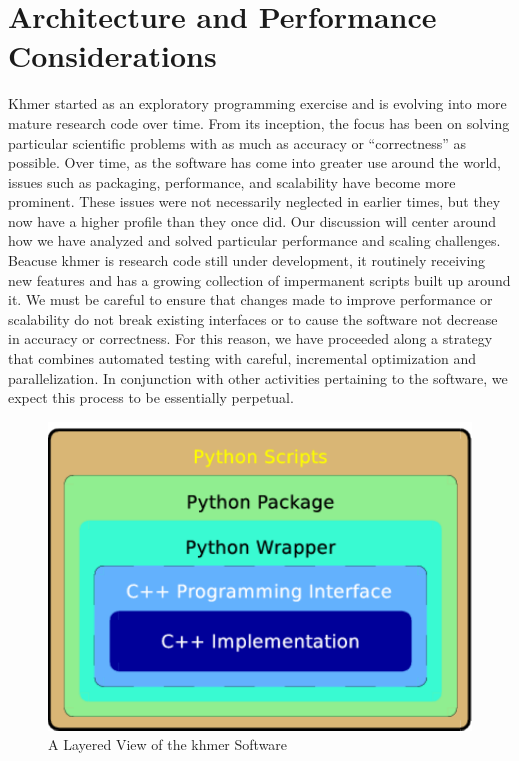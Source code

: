 \documentclass{article}
\begin{document}
\section{Architecture and Performance Considerations}

Khmer started as an exploratory programming exercise and is evolving into
more mature research code over time.
From its inception, the focus has been on solving
particular scientific problems with as much as accuracy or ``correctness'' as
possible. Over time, as the software has come into greater use around the
world, issues such as packaging, performance, and scalability have become more
prominent. These issues were not necessarily neglected in earlier times, but
they now have a higher profile than they once did. Our discussion will center
around how we have analyzed and solved particular performance and scaling
challenges.
Beacuse khmer is research code still under development, it routinely
receiving new features and
has a growing collection of impermanent scripts built up around it.  We must
be careful to ensure that changes made to
improve performance or scalability do not break existing
interfaces or to cause the software not decrease in accuracy or
correctness. For this reason, we have proceeded along a strategy that
combines automated testing with careful,
incremental optimization and parallelization. In conjunction with other
activities pertaining to the software, we expect this process to be essentially perpetual.

\begin{figure}[ht!]
\centering
\includegraphics[scale=0.6]{layers.pdf}
\caption{A Layered View of the khmer Software}
\label{khmerLayers}
\end{figure}
\end{document}
